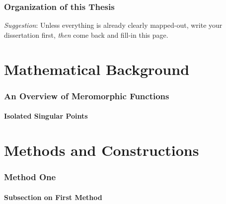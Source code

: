 \documentclass[11pt]{gthesis2}  %
\begin{document}
\section{Organization of this Thesis}
\label{sec:thesis-org}
%
\noindent \emph{Suggestion}: Unless everything is already clearly
mapped-out, write your dissertation first, \emph{then} come back
and fill-in this page.
%
%
\newpage
%
\part{Mathematical Background}
\label{part:back}
%
%
%
\section{An Overview of Meromorphic Functions}
\label{sec:overview}
%
%
\subsection{Isolated Singular Points}
\label{sub:singpts}  
%
%
%
\newpage
%
\part{Methods and Constructions}
\label{part:mandc}
%
\section{Method One}
\label{sec:meth1}
%
%
\subsection{Subsection on First Method}
\label{sub:medI}
%
%
\newpage
%
\end{document}
